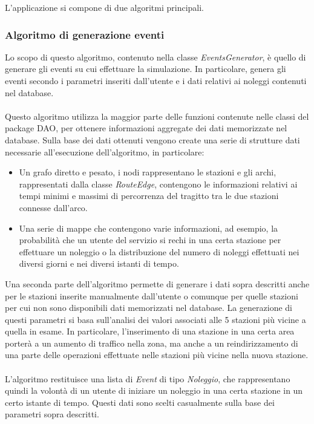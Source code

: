 \documentclass[a4paper, 12pt]{article}
\begin{document}
	L'applicazione si compone di due algoritmi principali.

	\subsubsection{Algoritmo di generazione eventi}

		Lo scopo di questo algoritmo, contenuto nella classe \textit{EventsGenerator}, è quello di generare gli eventi su cui effettuare la simulazione. In particolare, genera gli eventi secondo i parametri inseriti dall'utente e i dati relativi ai noleggi contenuti nel database.\\\\
		Questo algoritmo utilizza la maggior parte delle funzioni contenute nelle classi del package DAO, per ottenere informazioni aggregate dei dati memorizzate nel database. Sulla base dei dati ottenuti vengono create una serie di strutture dati necessarie all'esecuzione dell'algoritmo, in particolare:

	\begin{itemize}
		\item Un grafo diretto e pesato, i nodi rappresentano le stazioni e gli archi, rappresentati dalla classe \textit{RouteEdge}, contengono le informazioni relativi ai tempi minimi e massimi di percorrenza del tragitto tra le due stazioni connesse dall'arco.
		\item Una serie di mappe che contengono varie informazioni, ad esempio, la probabilità che un utente del servizio si rechi in una certa stazione per effettuare un noleggio o la distribuzione del numero di noleggi effettuati nei diversi giorni e nei diversi istanti di tempo.\\
	\end{itemize}
Una seconda parte dell'algoritmo permette di generare i dati sopra descritti anche per le stazioni inserite manualmente dall'utente o comunque per quelle stazioni per cui non sono disponibili dati memorizzati nel database. La generazione di questi parametri si basa sull'analisi dei valori associati alle 5 stazioni più vicine a quella in esame.
In particolare, l'inserimento di una stazione in una certa area porterà a un aumento di traffico nella zona, ma anche a un reindirizzamento di una parte delle operazioni effettuate nelle stazioni più vicine nella nuova stazione.\\\\
L'algoritmo restituisce una lista di \textit{Event} di tipo \textit{Noleggio}, che rappresentano quindi la volontà di un utente di iniziare un noleggio in una certa stazione in un certo istante di tempo. Questi dati sono scelti casualmente sulla base dei parametri sopra descritti.
\end{document}
